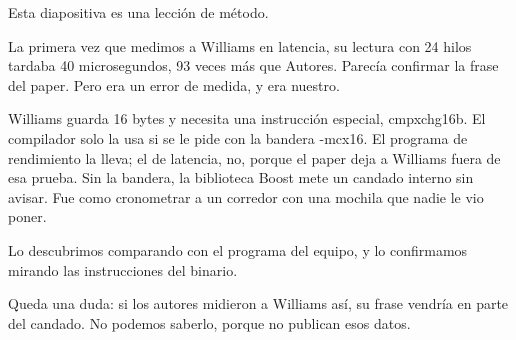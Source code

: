 Esta diapositiva es una lección de método.

La primera vez que medimos a Williams en latencia, su lectura con 24 hilos tardaba 40 microsegundos, 93 veces más que Autores. Parecía confirmar la frase del paper. Pero era un error de medida, y era nuestro.

Williams guarda 16 bytes y necesita una instrucción especial, cmpxchg16b. El compilador solo la usa si se le pide con la bandera -mcx16. El programa de rendimiento la lleva; el de latencia, no, porque el paper deja a Williams fuera de esa prueba. Sin la bandera, la biblioteca Boost mete un candado interno sin avisar. Fue como cronometrar a un corredor con una mochila que nadie le vio poner.

Lo descubrimos comparando con el programa del equipo, y lo confirmamos mirando las instrucciones del binario.

Queda una duda: si los autores midieron a Williams así, su frase vendría en parte del candado. No podemos saberlo, porque no publican esos datos.
